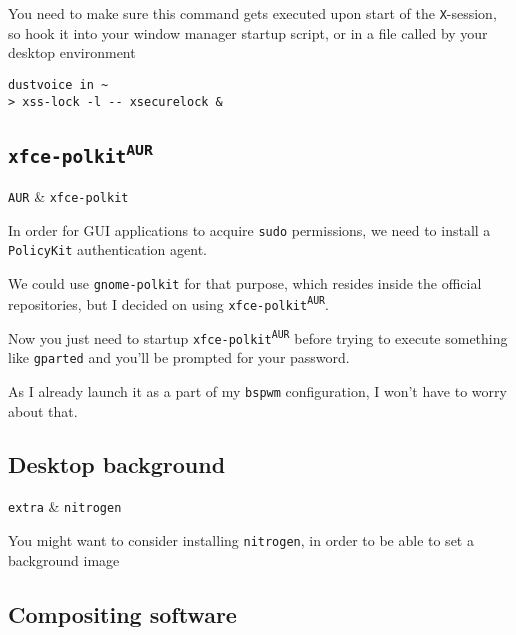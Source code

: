\documentclass[10pt]{dustdoc}
\begin{document}
\begin{IMPORTANT}
    You need to make sure this command gets executed upon start of the \texttt{X}-session, so hook it into your window manager startup script, or in a file called by your desktop environment

    \begin{verbatim}
dustvoice in ~
> xss-lock -l -- xsecurelock &
    \end{verbatim}

\end{IMPORTANT}

\subsection{\texttt{xfce-polkit\texorpdfstring{\textsuperscript{AUR}}{ (AUR)}}}%
\label{sec:xfce-polkit-aur}

\begin{pkgtable}
    \texttt{AUR} & \texttt{xfce-polkit} \\
\end{pkgtable}

In order for GUI applications to acquire \texttt{sudo} permissions, we need to install a \texttt{PolicyKit} authentication agent.

We could use \texttt{gnome-polkit} for that purpose, which resides inside the official repositories, but I decided on using \texttt{xfce-polkit\textsuperscript{\texttt{AUR}}}.

Now you just need to startup \texttt{xfce-polkit\textsuperscript{\texttt{AUR}}} before trying to execute something like \texttt{gparted} and you’ll be prompted for your password.

As I already launch it as a part of my \texttt{bspwm} configuration, I won’t have to worry about that.

\subsection{Desktop background}%
\label{sec:desktop-background}

\begin{pkgtable}
    \texttt{extra} & \texttt{nitrogen} \\
\end{pkgtable}

You might want to consider installing \texttt{nitrogen}, in order to be able to set a background image

\subsection{Compositing software}%
\label{sec:compositing-software}
\end{document}
